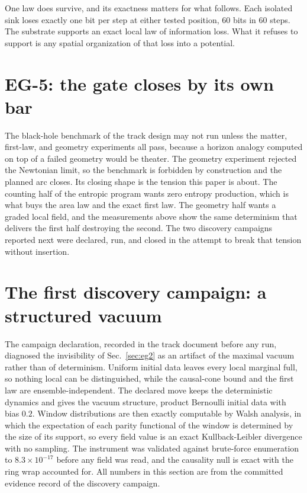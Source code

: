 \documentclass[aps,pre,reprint,nofootinbib]{revtex4-2}
\begin{document}
One law does survive, and its exactness matters for what follows.
Each isolated sink loses exactly one bit per step at either tested
position, $60$ bits in $60$ steps.  The substrate supports an exact
local law of information loss.  What it refuses to support is any
spatial organization of that loss into a potential.

\section{EG-5: the gate closes by its own bar}
\label{sec:eg5}

The black-hole benchmark of the track design may not run unless the
matter, first-law, and geometry experiments all pass, because a
horizon analogy computed on top of a failed geometry would be
theater.  The geometry experiment rejected the Newtonian limit, so
the benchmark is forbidden by construction and the planned arc
closes.  Its closing shape is the tension this paper is about.  The
counting half of the entropic program wants zero entropy production,
which is what buys the area law and the exact first law.  The
geometry half wants a graded local field, and the measurements above
show the same determinism that delivers the first half destroying
the second.  The two discovery campaigns reported next were declared,
run, and closed in the attempt to break that tension without
insertion.

\section{The first discovery campaign: a structured vacuum}
\label{sec:eg4b}

The campaign declaration, recorded in the track document before any
run, diagnosed the invisibility of Sec.~\ref{sec:eg2} as an artifact
of the maximal vacuum rather than of determinism.  Uniform initial
data leaves every local marginal full, so nothing local can be
distinguished, while the causal-cone bound and the first law are
ensemble-independent.  The declared move keeps the deterministic
dynamics and gives the vacuum structure, product Bernoulli initial
data with bias $0.2$.  Window distributions are then exactly
computable by Walsh analysis, in which the expectation of each parity
functional of the window is determined by the size of its support,
so every field value is an exact Kullback-Leibler divergence with no
sampling.  The instrument was validated against brute-force
enumeration to $8.3\times10^{-17}$ before any field was read, and the
causality null is exact with the ring wrap accounted for.  All
numbers in this section are from the committed evidence record of
the discovery campaign.
\end{document}
